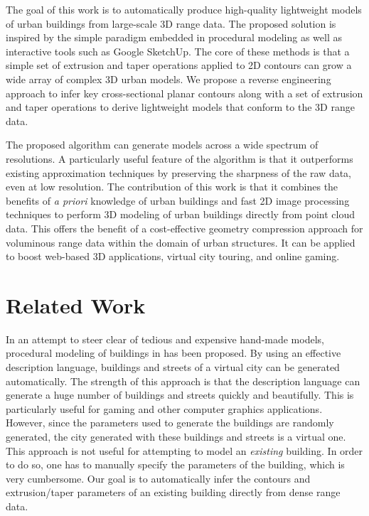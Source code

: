The goal of this work is to automatically produce high-quality
lightweight models of urban buildings from large-scale 3D range data.
The proposed solution is inspired by the simple paradigm embedded in
procedural modeling as well as interactive tools such as Google SketchUp.
The core of these methods is that a simple set of extrusion and taper
operations applied to 2D contours can grow a wide array of complex 3D urban
models.
We propose a reverse engineering approach to infer key cross-sectional
planar contours along with a set of extrusion and taper operations to derive
lightweight models that conform to the 3D range data.

The proposed algorithm can generate models across a wide spectrum of
resolutions.
A particularly useful feature of the algorithm is that it outperforms
existing approximation techniques by preserving the sharpness of the raw
data, even at low resolution.
The contribution of this work is that it combines the benefits of
\emph{a priori} knowledge of urban buildings and fast 2D image
processing techniques to perform 3D modeling of urban buildings directly
from point cloud data.
This offers the benefit of a cost-effective geometry compression
approach for voluminous range data within the domain of urban structures.
It can be applied to boost web-based 3D applications, virtual city touring,
and online gaming.

\section{Related Work}

In an attempt to steer clear of tedious and expensive hand-made models,
procedural modeling of buildings in \cite{PMB_MWH,PMB_WWS,PMB_PM} has been proposed.
By using an effective description language, buildings and streets of a virtual
city can be generated automatically.
The strength of this approach is that the description language can generate
a huge number of buildings and streets quickly and beautifully.
This is particularly useful for gaming and other computer graphics applications.
However, since the parameters used to generate the buildings are randomly
generated, the city generated with these buildings and streets is a virtual one.
This approach is not useful for attempting to model an {\it existing} building.
In order to do so, one has to manually specify the parameters of the building,
which is very cumbersome.
Our goal is to automatically infer the contours and extrusion/taper parameters
of an existing building directly from dense range data.

